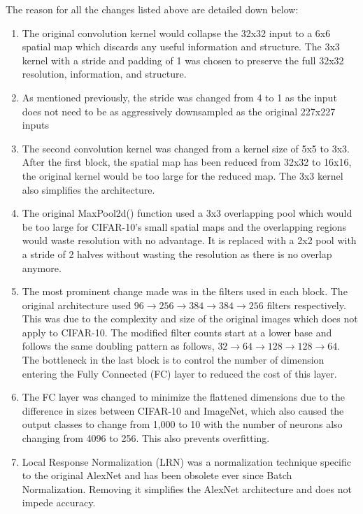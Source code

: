 \documentclass[a4paper]{article}
\begin{document}
The reason for all the changes listed above are detailed down below:
\begin{enumerate}
    \item The original convolution kernel would collapse the 32x32 input to a 6x6 spatial map which discards any useful information and structure. The 3x3 kernel with a stride and padding of 1 was chosen to preserve the full 32x32 resolution, information, and structure.
    \item As mentioned previously, the stride was changed from 4 to 1 as the input does not need to be as aggressively downsampled as the original 227x227 inputs
    \item The second convolution kernel was changed from a kernel size of 5x5 to 3x3. After the first block, the spatial map has been reduced from 32x32 to 16x16, the original kernel would be too large for the reduced map. The 3x3 kernel also simplifies the architecture.
    \item The original MaxPool2d() function used a 3x3 overlapping pool which would be too large for CIFAR-10's small spatial maps and the overlapping regions would waste resolution with no advantage. It is replaced with a 2x2 pool with a stride of 2 halves without wasting the resolution as there is no overlap anymore.
    \item The most prominent change made was in the filters used in each block. The original architecture used $96 \rightarrow 256 \rightarrow 384 \rightarrow 384 \rightarrow 256$ filters respectively. This was due to the complexity and size of the original images which does not apply to CIFAR-10. The modified filter counts start at a lower base and follows the same doubling pattern as follows, $32 \rightarrow 64 \rightarrow 128 \rightarrow 128 \rightarrow 64$. The bottleneck in the last block is to control the number of dimension entering the Fully Connected (FC) layer to reduced the cost of this layer.
    \item The FC layer was changed to minimize the flattened dimensions due to the difference in sizes between CIFAR-10 and ImageNet, which also caused the output classes to change from 1,000 to 10 with the number of neurons also changing from 4096 to 256. This also prevents overfitting.
    \item Local Response Normalization (LRN) was a normalization technique specific to the original AlexNet and has been obsolete ever since Batch Normalization. Removing it simplifies the AlexNet architecture and does not impede accuracy.
\end{enumerate}
\end{document}
